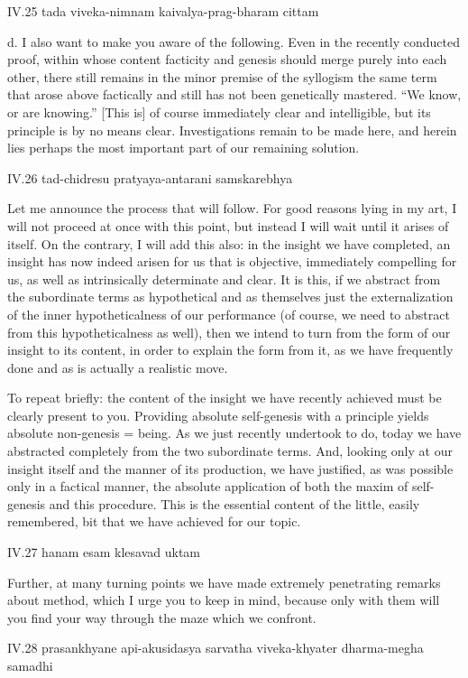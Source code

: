IV.25
tada viveka-nimnam kaivalya-prag-bharam cittam

d. I also want to make you aware of the following.
Even in the recently conducted proof,
within whose content facticity and genesis should merge
purely into each other,
there still remains in the minor premise of the syllogism
the same term that arose above factically
and still has not been genetically mastered.
“We know, or are knowing.”
[This is] of course immediately clear and intelligible,
but its principle is by no means clear.
Investigations remain to be made here,
and herein lies perhaps the most important
part of our remaining solution.

IV.26
tad-chidresu pratyaya-antarani samskarebhya

Let me announce the process that will follow.
For good reasons lying in my art,
I will not proceed at once with this point,
but instead I will wait until it arises of itself.
On the contrary, I will add this also:
in the insight we have completed,
an insight has now indeed arisen for us
that is objective, immediately compelling for us,
as well as intrinsically determinate and clear.
It is this, if we abstract from the subordinate terms
as hypothetical and as themselves just the externalization of
the inner hypotheticalness of our performance
(of course, we need to abstract from this hypotheticalness as well),
then we intend to turn from the form of our insight
to its content, in order to explain the form from it,
as we have frequently done and as is actually a realistic move.

To repeat briefly:
the content of the insight we have recently achieved
must be clearly present to you.
Providing absolute self-genesis with a principle
yields absolute non-genesis = being.
As we just recently undertook to do,
today we have abstracted completely
from the two subordinate terms.
And, looking only at our insight itself
and the manner of its production, we have justified,
as was possible only in a factical manner,
the absolute application of both
the maxim of self-genesis and this procedure.
This is the essential content of the little, easily remembered,
bit that we have achieved for our topic.

IV.27
hanam esam klesavad uktam

Further, at many turning points we have made extremely
penetrating remarks about method,
which I urge you to keep in mind,
because only with them will you find
your way through the maze which we confront.

IV.28
prasankhyane api-akusidasya sarvatha viveka-khyater dharma-megha samadhi

